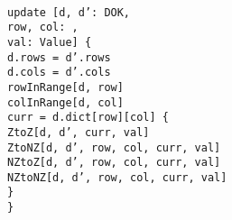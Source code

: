 \begin{myquote}\small{\texttt{\\
\Bpred update [d, d': DOK,\\
\TD row, col: \Bint,\\
\TD val: Value] \{\\
\TA d.rows = d'.rows\\
\TA d.cols = d'.cols\\
\TA rowInRange[d, row]\\
\TA colInRange[d, col]\\
\TA \Blet curr = d.dict[row][col] \{\\
\TB ZtoZ[d, d', curr, val] \Bor\\
\TB ZtoNZ[d, d', row, col, curr, val] \Bor\\
\TB NZtoZ[d, d', row, col, curr, val] \Bor\\
\TB NZtoNZ[d, d', row, col, curr, val]\\
\TA\}\\
\}
}}
\end{myquote}